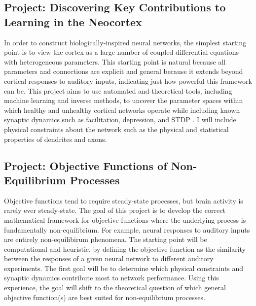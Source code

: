\documentclass[a4paper,11pt]{article}
\begin{document}
\subsection*{Project: Discovering Key Contributions to Learning in the Neocortex}
In order to construct biologically-inspired neural networks, the simplest starting point is to view the cortex as a large number of coupled differential equations with heterogeneous parameters. This starting point is natural  because all parameters and connections are explicit and general because it extends beyond cortical responses to auditory inputs, indicating just how powerful this framework can be. This project aims to use automated and theoretical tools, including machine learning and inverse methods, to uncover the parameter spaces within which healthy and unhealthy cortical networks operate while including known synaptic dynamics such as facilitation, depression, and STDP \cite{lee2018training}. I will include physical constraints about the network such as the physical and statistical properties of dendrites and axons.

\subsection*{Project: Objective Functions of Non-Equilibrium Processes}
Objective functions tend to require steady-state processes, but brain activity is rarely ever steady-state. The goal of this project is to develop the correct mathematical framework for objective functions where the underlying process is fundamentally non-equilibrium. For example, neural responses to auditory inputs are entirely non-equilibirum phenomena. The starting point will be computational and heuristic, by defining the objective function as the similarity between the responses of a given neural network to different auditory experiments. The first goal will be to determine which physical constraints and synaptic dynamics contribute most to network performance. Using this experience, the goal will shift to the theoretical question of which general objective function(s) are best suited for non-equilibrium processes.



\end{document}
